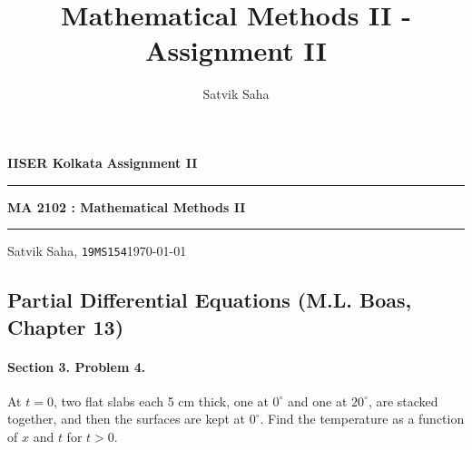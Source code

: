 \documentclass[10pt]{article}
\title{Mathematical Methods II - Assignment II}
\author{Satvik Saha}
\date{}
\begin{document}
        \par\textbf{IISER Kolkata} \hfill \textbf{Assignment II}
        \vspace{3pt}
        \hrule
        \vspace{3pt}
        \begin{center}
                \LARGE{\textbf{MA 2102 : Mathematical Methods II}}
        \end{center}
        \vspace{3pt}
        \hrule
        \vspace{3pt}
        Satvik Saha, \texttt{19MS154}\hfill\today
        \vspace{20pt}
        \subsection*{Partial Differential Equations (M.L. Boas, Chapter 13)}
        \paragraph{Section 3. Problem 4.} At $t = 0$, two flat slabs each 5 cm thick, one at $0^\circ$ and one at $20^\circ$, are stacked together,
        and then the surfaces are kept at $0^\circ$. Find the temperature as a function of $x$ and $t$ for $t > 0$. \\
\end{document}
